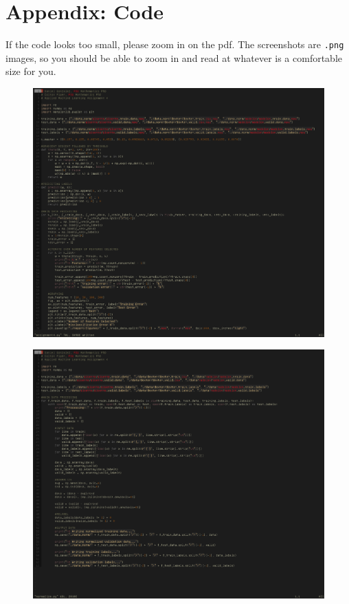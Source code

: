 \documentclass[UTF8]{article}
\begin{document}
\section{Appendix: Code}
If the code looks too small, please zoom in on the pdf.
The screenshots are \texttt{.png} images, so you should be able to zoom in and read at whatever is a comfortable size for you.
\begin{figure}[H]
    \centering
    \includegraphics[scale=0.6]{./figures/code-TISP.png}
\end{figure}
\begin{figure}[H]
    \centering
    \includegraphics[scale=0.6]{./figures/code-normalize.png}
\end{figure}
\end{document}
